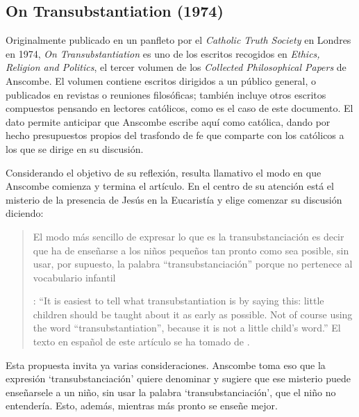 \subsection{On Transubstantiation (1974)}

Originalmente publicado en un panfleto por el \emph{Catholic Truth Society} en Londres en 1974, \emph{On Transubstantiation} es uno de los escritos recogidos en \emph{Ethics, Religion and Politics}, el tercer volumen de los \emph{Collected Philosophical Papers} de Anscombe. El volumen contiene escritos dirigidos a un público general, o publicados en revistas o reuniones filosóficas; también incluye otros escritos compuestos pensando en lectores católicos, como es el caso de este documento. El dato permite anticipar que Anscombe escribe aquí como católica, dando por hecho presupuestos propios del trasfondo de fe que comparte con los católicos a los que se dirige en su discusión.

Considerando el objetivo de su reflexión, resulta llamativo el modo en que Anscombe comienza y termina el artículo. En el centro de su atención está el misterio de la presencia de Jesús en la Eucaristía y elige comenzar su discusión diciendo: \blockquote[
{\Cite[108]{anscombe1981erp:ot}}: \enquote{It is easiest to tell what transubstantiation is by saying this: little children should be taught about it as early as possible. Not of course using the word ``transubstantiation'', because it is not a little child's word.} El texto en español de este artículo se ha tomado de {\cite{torralbaynubiola2005fayeh:ot}}.
]{El modo más sencillo de expresar lo que es la transubstanciación es decir que ha de enseñarse a los niños pequeños tan pronto como sea posible, sin usar, por supuesto, la palabra ``transubstanciación'' porque no pertenece al vocabulario infantil}. Esta propuesta invita ya varias consideraciones. Anscombe toma eso que la expresión `transubstanciación' quiere denominar y sugiere que ese misterio puede enseñarsele a un niño, sin usar la palabra `transubstanciación', que el niño no entendería. Esto, además, mientras más pronto se enseñe mejor.

